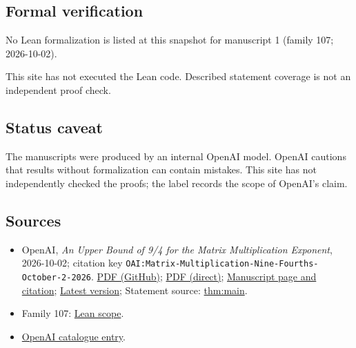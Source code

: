 \documentclass[11pt]{article}
\begin{document}
\subsection{Formal verification}
No Lean formalization is listed at this snapshot for manuscript 1 (family 107; 2026-10-02).

This site has not executed the Lean code. Described statement coverage is not an independent proof check.

\subsection{Status caveat}
The manuscripts were produced by an internal OpenAI model. OpenAI cautions that results without formalization can contain mistakes. This site has not independently checked the proofs; the label records the scope of OpenAI's claim.

\subsection{Sources}
\begin{itemize}
\item OpenAI, \emph{An Upper Bound of 9/4 for the Matrix Multiplication Exponent}, 2026-10-02; citation key \texttt{OAI:Matrix-Multiplication-Nine-Fourths-October-2-2026}. \href{https://github.com/openai/math/blob/adc7f1241b42e322a6451854ab7e4b4c146bf78a/preprints/Matrix-Multiplication-Nine-Fourths-October-2-2026/paper.pdf}{PDF (GitHub)}; \href{https://github.com/openai/math/raw/adc7f1241b42e322a6451854ab7e4b4c146bf78a/preprints/Matrix-Multiplication-Nine-Fourths-October-2-2026/paper.pdf}{PDF (direct)}; \href{https://github.com/openai/math/blob/adc7f1241b42e322a6451854ab7e4b4c146bf78a/preprints/Matrix-Multiplication-Nine-Fourths-October-2-2026/README.md}{Manuscript page and citation}; \href{https://github.com/openai/math/blob/main/preprints/Matrix-Multiplication-Nine-Fourths-October-2-2026/paper.pdf}{Latest version}; Statement source: \href{https://github.com/openai/math/blob/adc7f1241b42e322a6451854ab7e4b4c146bf78a/preprints/Matrix-Multiplication-Nine-Fourths-October-2-2026/build/paper.tex\#L45}{thm:main}.
\item Family 107: \href{https://github.com/openai/math/blob/adc7f1241b42e322a6451854ab7e4b4c146bf78a/lean/docs/107.md}{Lean scope}.
\item \href{https://github.com/openai/math/blob/adc7f1241b42e322a6451854ab7e4b4c146bf78a/CONTENTS.md}{OpenAI catalogue entry}.
\end{itemize}
\end{document}
